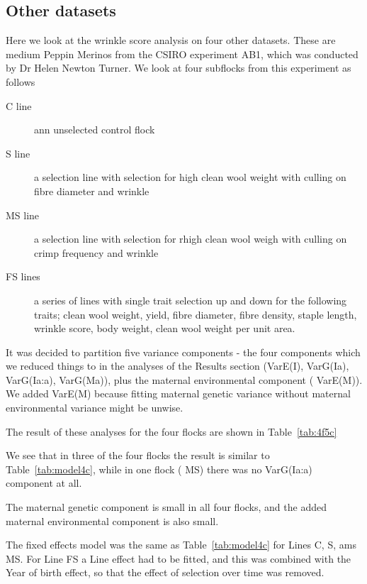 \documentclass[titlepage]{article}  %
\begin{document}
\subsection{Other datasets}
Here we look at the wrinkle score analysis on four other datasets. These are medium Peppin Merinos from the CSIRO experiment AB1, which was conducted by Dr Helen Newton Turner. We look at four subflocks from this experiment as follows
\begin{description}
\item[C line] ann unselected control flock
\item[S line] a selection line with selection for high clean wool weight with culling on fibre diameter and wrinkle
\item[MS line] a selection line with selection for rhigh clean wool weigh with culling on crimp frequency and wrinkle
\item[FS lines] a series of lines with single trait selection up and down for the following traits; clean wool weight, yield, fibre diameter, fibre density, staple length, wrinkle score, body weight, clean wool weight per unit area. 
\end{description}

It was decided to partition five variance components - the four components which we reduced things to in the analyses of the Results section (VarE(I), VarG(Ia), VarG(Ia:a), VarG(Ma)), plus the maternal environmental component ( VarE(M)). We added VarE(M) because fitting maternal genetic variance without maternal environmental variance might be unwise.

The result of these analyses for the four flocks are shown in Table~\ref{tab:4f5c}

We see that in three of the four flocks the result is similar to Table~\ref{tab:model4c}, while in one flock ( MS) there was no VarG(Ia:a) component at all.

The maternal genetic component is small in all four flocks, and the added maternal environmental component is also small.

The fixed effects model was the same as Table~\ref{tab:model4c} for Lines C, S, ams MS. For Line FS a Line effect had to be fitted, and this was combined with the Year of birth effect, so that the effect of selection over time was removed.
\end{document}
